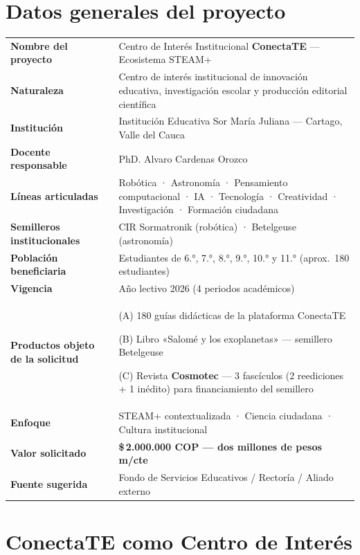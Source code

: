 \documentclass[12pt, letterpaper]{article}
\newcommand{\pesos}[1]{\$\,#1}
\newcommand{\rubrica}[1]{\textcolor{smjVino}{\textbf{#1}}}
\begin{document}
\section{Datos generales del proyecto}

\renewcommand{\arraystretch}{1.30}
\begin{tabularx}{\linewidth}{>{\bfseries\color{smjAzul}}p{4.6cm} X}
\toprule
Nombre del proyecto      & Centro de Interés Institucional \textbf{ConectaTE} — Ecosistema STEAM+ \\
Naturaleza               & Centro de interés institucional de innovación educativa, investigación escolar y producción editorial científica \\
Institución              & Institución Educativa Sor María Juliana — Cartago, Valle del Cauca \\
Docente responsable      & PhD. Alvaro Cardenas Orozco \\
Líneas articuladas       & Robótica · Astronomía · Pensamiento computacional · IA · Tecnología · Creatividad · Investigación · Formación ciudadana \\
Semilleros institucionales & CIR Sormatronik (robótica) · Betelgeuse (astronomía) \\
Población beneficiaria   & Estudiantes de 6.°{}, 7.°{}, 8.°{}, 9.°{}, 10.°{} y 11.°{} (aprox.\ 180 estudiantes) \\
Vigencia                 & Año lectivo 2026 (4 periodos académicos) \\
Productos objeto de la solicitud & (A) 180 guías didácticas de la plataforma ConectaTE \par (B) Libro «Salomé y los exoplanetas» — semillero Betelgeuse \par (C) Revista \textbf{Cosmotec} — 3 fascículos (2 reediciones + 1 inédito) para financiamiento del semillero \\
Enfoque                  & STEAM+ contextualizada · Ciencia ciudadana · Cultura institucional \\
Valor solicitado         & \rubrica{\pesos{2.000.000} COP — dos millones de pesos m/cte} \\
Fuente sugerida          & Fondo de Servicios Educativos / Rectoría / Aliado externo \\
\bottomrule
\end{tabularx}

\section{ConectaTE como Centro de Interés}
\end{document}
